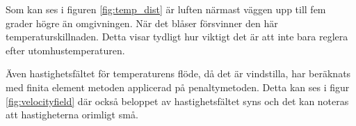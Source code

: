 Som kan ses i figuren \ref{fig:temp_dist} är luften närmast väggen upp till fem grader 
högre än omgivningen. När det blåser försvinner den här temperaturskillnaden. Detta 
visar tydligt hur viktigt det är att inte bara reglera efter utomhustemperaturen. 


Även hastighetsfältet för temperaturens flöde, då det är vindstilla, har beräknats med finita element metoden 
applicerad på penaltymetoden. Detta kan ses i figur \ref{fig:velocityfield} där också 
beloppet av hastighetsfältet syns och det kan noteras att hastigheterna orimligt små.

\begin{figure}[hpbt]
\begin{center}
\end{center}
\end{figure}
